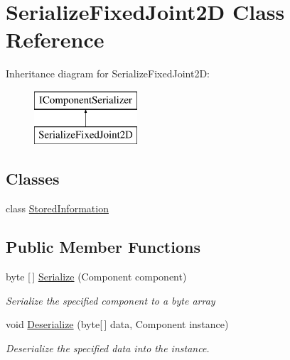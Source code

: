 \hypertarget{class_serialize_fixed_joint2_d}{}\section{Serialize\+Fixed\+Joint2D Class Reference}
\label{class_serialize_fixed_joint2_d}
Inheritance diagram for Serialize\+Fixed\+Joint2D\+:\begin{figure}[H]
\begin{center}
\leavevmode
\includegraphics[height=2.000000cm]{class_serialize_fixed_joint2_d}
\end{center}
\end{figure}
\subsection*{Classes}
\begin{DoxyCompactItemize}
\item 
class \hyperlink{class_serialize_fixed_joint2_d_1_1_stored_information}{Stored\+Information}
\end{DoxyCompactItemize}
\subsection*{Public Member Functions}
\begin{DoxyCompactItemize}
\item 
byte \mbox{[}$\,$\mbox{]} \hyperlink{class_serialize_fixed_joint2_d_a9eb05bc525fe5cbf55dd5e917e2f36f2}{Serialize} (Component component)
\begin{DoxyCompactList}\small\item\em Serialize the specified component to a byte array \end{DoxyCompactList}\item 
void \hyperlink{class_serialize_fixed_joint2_d_aa2cc872282e6bb7c209ac406fb0b8335}{Deserialize} (byte\mbox{[}$\,$\mbox{]} data, Component instance)
\begin{DoxyCompactList}\small\item\em Deserialize the specified data into the instance. \end{DoxyCompactList}\end{DoxyCompactItemize}


